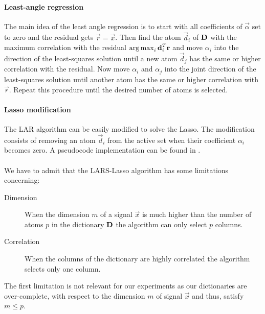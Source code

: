 \paragraph{Least-angle regression}
The main idea of the least angle regression is to start with all coefficients
of $\vec{\alpha}$ set to zero and the residual gets $\vec{r}=\vec{x}$. Then
find the atom $\vec{d}_i$ of $\boldsymbol{\mathrm{D}}$ with the maximum correlation
with the residual $\operatorname*{arg\,max}_i\boldsymbol{\mathrm{d}}_i^T\boldsymbol{\mathrm{r}}$ and move $\alpha_i$ 
into the direction of the least-squares solution until a new atom
$\vec{d}_j$ has the same or higher correlation with the residual. Now move
$\alpha_i$ and $\alpha_j$ into the joint direction of the
least-squares solution until another atom has the same or higher correlation
with $\vec{r}$. Repeat this procedure until the desired number of atoms is
selected.



\paragraph{Lasso modification}
The LAR algorithm can be easily modified to solve the Lasso. 
The modification consists of removing an atom $\vec{d}_i$ from the active set
when their coefficient $\alpha_i$ becomes zero. A pseudocode implementation can
be found in .

\paragraph{}
We have to admit that the LARS-Lasso algorithm has some limitations concerning:
\begin{description}
 \item[Dimension] When the dimension $m$ of a signal $\vec{x}$ is much
higher than the number of atoms $p$ in the dictionary $\boldsymbol{\mathrm{D}}$ the algorithm
can only select $p$ columns.
  \item[Correlation] When the columns of the dictionary are highly correlated
the algorithm selects only one column.
\end{description}
The first limitation is not relevant for our experiments as our dictionaries
are over-complete, with respect to the dimension $m$ of signal $\vec{x}$ and
thus, satisfy $m \leq p$. 


